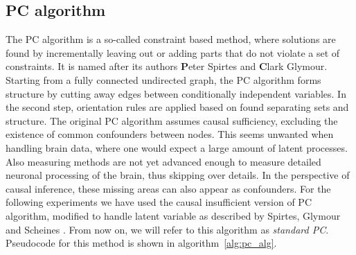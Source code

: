 \documentclass[a4paper, english]{article}
\begin{document}
\subsection{PC algorithm}
The PC algorithm is a so-called constraint based method, where solutions are found by incrementally leaving out or adding parts that do not violate a set of constraints.
It is named after its authors \textbf{P}eter Spirtes and \textbf{C}lark Glymour.
Starting from a fully connected undirected graph, the PC algorithm forms structure by cutting away edges between conditionally independent variables.
In the second step, orientation rules are applied based on found separating sets and structure.
The original PC algorithm assumes causal sufficiency, excluding the existence of common confounders between nodes.
This seems unwanted when handling brain data, where one would expect a large amount of latent processes.
Also measuring methods are not yet advanced enough to measure detailed neuronal processing of the brain, thus skipping over details.
In the perspective of causal inference, these missing areas can also appear as confounders.
For the following experiments we have used the causal insufficient version of PC algorithm, modified to handle latent variable as described by Spirtes, Glymour and Scheines \cite[p.165-167]{spirtes2000}.
From now on, we will refer to this algorithm as \textit{standard PC}.
Pseudocode for this method is shown in algorithm~\ref{alg:pc_alg}.
\end{document}
